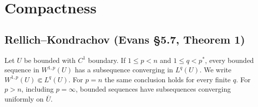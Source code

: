\section{Compactness}
\label{sec:5-7}

\subsection{Rellich--Kondrachov (Evans \S5.7, Theorem 1)}
\begin{theorem}\label{thm:5-rellich}
Let $U$ be bounded with $C^1$ boundary. If $1\leq p<n$ and
$1\leq q<p^*$, every bounded sequence in $W^{1,p}(U)$ has a subsequence
converging in $L^q(U)$. We write $W^{1,p}(U)\Subset L^q(U)$.
For $p=n$ the same conclusion holds for every finite $q$.
For $p>n$, including $p=\infty$, bounded sequences have subsequences
converging uniformly on $\overline U$.
\end{theorem}
\Needspace{45mm}
